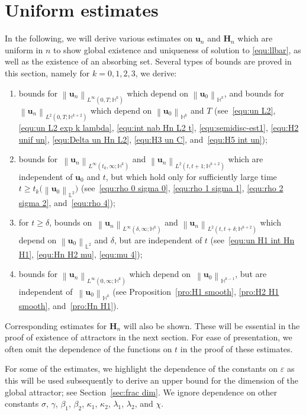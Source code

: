 \documentclass[11pt, reqno]{amsart}
\theoremstyle{definition}
\numberwithin{equation}{section}
\newcommand{\bff}{\boldsymbol}
\newcommand{\bb}{\mathbb}
\newcommand{\norm}[2]{\left\|{#1}\right\|_{#2}}
\begin{document}
\section{Uniform estimates}\label{sec:exist}

In the following, we will derive various estimates on $\bff{u}_n$ and $\bff{H}_n$ which are uniform in $n$ to
show global existence and uniqueness of solution to \eqref{equ:llbar},
as well as the existence of an absorbing set.
Several types of bounds are proved in this section, namely for $k=0,1,2,3$, we derive:
\begin{enumerate}
    \item bounds for $\norm{\bff{u}_n}{L^\infty(0,T; \bb{H}^k)}$ which depend on $\norm{\bff{u}_0}{\bb{H}^k}$, and bounds for $\norm{\bff{u}_n}{L^2(0,T; \bb{H}^{k+2})}$ which depend on $\norm{\bff{u}_0}{\bb{H}^k}$ and $T$ (see~\eqref{equ:un L2}, \eqref{equ:un L2 exp k lambda}, \eqref{equ:int nab Hn L2 t}, \eqref{equ:semidisc-est1}, \eqref{equ:H2 unif un}, \eqref{equ:Delta un Hn L2}, \eqref{equ:H3 un C}, and~\eqref{equ:H5 int un});
    \item bounds for~$\norm{\bff{u}_n}{L^\infty(t_k,\infty; \bb{H}^k)}$ and $\norm{\bff{u}_n}{L^2(t,t+1; \bb{H}^{k+2})}$ which are independent of $\bff{u}_0$ and $t$, but which hold only for sufficiently large time $t\geq t_k\big(\norm{\bff{u}_0}{\bb{L}^2}\big)$ (see~\eqref{equ:rho 0 sigma 0}, \eqref{equ:rho 1 sigma 1}, \eqref{equ:rho 2 sigma 2}, and~\eqref{equ:rho 4});
    \item for $t\geq \delta$, bounds on~$\norm{\bff{u}_n}{L^\infty(\delta,\infty; \bb{H}^k)}$ and $\norm{\bff{u}_n}{L^2(t,t+\delta; \bb{H}^{k+2})}$ which depend on $\norm{\bff{u}_0}{\bb{L}^2}$ and $\delta$, but are independent of $t$ (see~\eqref{equ:un H1 int Hn H1}, \eqref{equ:Hn H2 mu}, \eqref{equ:mu 4});
    \item bounds for $\norm{\bff{u}_n}{L^\infty(0,\infty; \bb{H}^k)}$ which depend on~$\norm{\bff{u}_0}{\bb{H}^{k-1}}$, but are independent of~$\norm{\bff{u}_0}{\bb{H}^k}$ (see Proposition~\ref{pro:H1 smooth}, \ref{pro:H2 H1 smooth}, and~\ref{pro:Hn H1}).
\end{enumerate}

Corresponding estimates for $\bff{H}_n$ will also be shown. These will be essential in the proof of existence of attractors in the next section.
For ease of presentation, we often omit the dependence of the functions on $t$ in the proof of these estimates. 

For some of the estimates, we highlight the dependence of the constants on $\varepsilon$ as this will be used subsequently to derive an upper bound for the dimension of the global attractor; see Section~\ref{sec:frac dim}. We ignore dependence on other constants $\sigma$, $\gamma$, $\beta_1$, $\beta_2$, $\kappa_1$, $\kappa_2$, $\lambda_1$, $\lambda_2$, and $\chi$.
\end{document}
